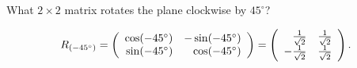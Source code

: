 \documentclass{ximera}
\begin{document}
\begin{exercise} \label{c4.2.1b}
What $2\times 2$ matrix rotates the plane clockwise by $45^\circ$?

\begin{solution}
\ans
\[
R_{(-45^\circ)} = \left(\begin{array}{rr} \cos (-45^\circ) & -\sin
(-45^\circ)\\ \sin (-45^\circ) &\cos (-45^\circ)\end{array}\right) =
\left(\begin{array}{rr} \frac{1}{\sqrt{2}} & \frac{1}{\sqrt{2}}\\ -\frac{1}{\sqrt{2}} &\frac{1}{\sqrt{2}}\end{array}\right).
\]

\end{solution}
\end{exercise}
\end{document}
